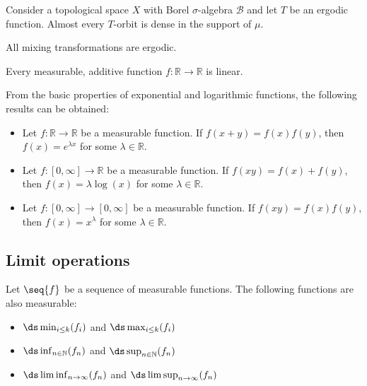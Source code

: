     \begin{property}
        Consider a topological space $X$ with Borel $\sigma$-algebra $\mathcal{B}$ and let $T$ be an ergodic function. Almost every $T$-orbit is dense in the support of $\mu$.
    \end{property}

    \begin{property}
        All mixing transformations are ergodic.
    \end{property}

    \begin{property}[Additivity]
        Every measurable, additive function $f:\mathbb{R}\rightarrow\mathbb{R}$ is linear.
    \end{property}
    \begin{result}
        From the basic properties of exponential and logarithmic functions, the following results can be obtained:
        \begin{itemize}
            \item Let $f:\mathbb{R}\rightarrow\mathbb{R}$ be a measurable function. If $f(x+y) = f(x)f(y)$, then $f(x)=e^{\lambda x}$ for some $\lambda\in\mathbb{R}$.
            \item Let $f:[0,\infty]\rightarrow\mathbb{R}$ be a measurable function. If $f(xy) = f(x)+f(y)$, then $f(x)=\lambda\log(x)$ for some $\lambda\in\mathbb{R}$.
            \item Let $f:[0,\infty]\rightarrow[0,\infty]$ be a measurable function. If $f(xy) = f(x)f(y)$, then $f(x)=x^\lambda$ for some $\lambda\in\mathbb{R}$.
        \end{itemize}
    \end{result}

\subsection{Limit operations}

    \begin{property}
        Let $\seq{f}$ be a sequence of measurable functions. The following functions are also measurable:
        \begin{itemize}
            \item $\ds\min_{i\leq k}(f_i)$ and $\ds\max_{i\leq k}(f_i)$
            \item $\ds\inf_{n\in\mathbb{N}}(f_n)$ and $\ds\sup_{n\in\mathbb{N}}(f_n)$
            \item $\ds\liminf_{n\rightarrow\infty}(f_n)$ and $\ds\limsup_{n\rightarrow\infty}(f_n)$
        \end{itemize}
    \end{property}

